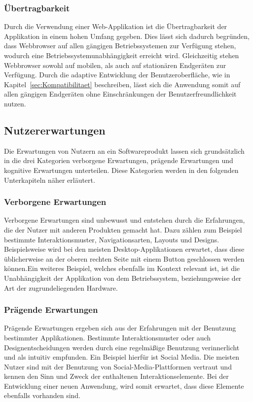 \subsubsection{Übertragbarkeit}
Durch die Verwendung einer Web-Applikation ist die Übertragbarkeit der Applikation in einem hohen Umfang gegeben.
Dies lässt sich dadurch begründen, dass Webbrowser auf allen gängigen Betriebssystemen zur Verfügung stehen, wodurch eine Betriebssystemunabhängigkeit erreicht wird.
Gleichzeitig stehen Webbrowser sowohl auf mobilen, als auch auf stationären Endgeräten zur Verfügung.
Durch die adaptive Entwicklung der Benutzeroberfläche, wie in Kapitel~\ref{sec:Kompatibilitaet} beschreiben, lässt sich die Anwendung somit auf allen gängigen Endgeräten ohne Einschränkungen der Benutzerfreundlichkeit nutzen.

\subsection{Nutzererwartungen}
Die Erwartungen von Nutzern an ein Softwareprodukt lassen sich grundsätzlich in die drei Kategorien verborgene Erwartungen, prägende Erwartungen und kognitive Erwartungen unterteilen.
Diese Kategorien werden in den folgenden Unterkapiteln näher erläutert.

\subsubsection{Verborgene Erwartungen}
Verborgene Erwartungen sind unbewusst und entstehen durch die Erfahrungen, die der Nutzer mit anderen Produkten gemacht hat.
Dazu zählen zum Beispiel bestimmte Interaktionsmuster, Navigationsarten, Layouts und Designs.
Beispielsweise wird bei den meisten Desktop-Applikationen erwartet, dass diese üblicherweise an der oberen rechten Seite mit einem Button geschlossen werden können.Ein weiteres Beispiel, welches ebenfalls im Kontext  relevant ist, ist die Unabhängigkeit der Applikation von dem Betriebssystem, beziehungsweise der Art der zugrundeliegenden Hardware.

\subsubsection{Prägende Erwartungen}
Prägende Erwartungen ergeben sich aus der Erfahrungen mit der Benutzung bestimmter Applikationen.
Bestimmte Interaktionsmuster oder auch Designentscheidungen werden durch eine regelmäßige Benutzung verinnerlicht und als intuitiv empfunden.
Ein Beispiel hierfür ist Social Media.
Die meisten Nutzer sind mit der Benutzung von Social-Media-Plattformen vertraut und kennen den Sinn und Zweck der enthaltenen Interaktionselemente.
Bei der Entwicklung einer neuen Anwendung, wird somit erwartet, dass diese Elemente ebenfalls vorhanden sind.

